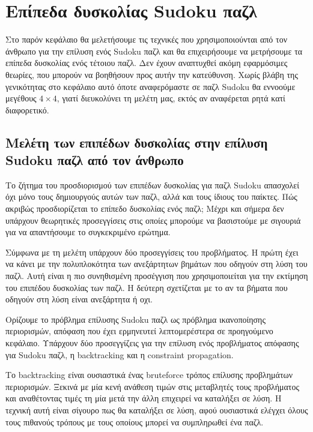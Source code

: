 \documentclass[oneside,12pt]{book}
\theoremstyle{definition}
\begin{document}
\chapter{Επίπεδα δυσκολίας Sudoku παζλ}

Στο παρόν κεφάλαιο θα μελετήσουμε τις τεχνικές που χρησιμοποιούνται από τον άνθρωπο για την επίλυση ενός Sudoku παζλ και θα επιχειρήσουμε να μετρήσουμε τα επίπεδα δυσκολίας ενός τέτοιου παζλ. Δεν έχουν αναπτυχθεί ακόμη εφαρμόσιμες θεωρίες, που μπορούν να βοηθήσουν προς αυτήν την κατεύθυνση. Χωρίς βλάβη της γενικότητας στο κεφάλαιο αυτό όποτε αναφερόμαστε σε παζλ Sudoku θα εννοούμε μεγέθους \(4 \times 4\), γιατί διευκολύνει τη μελέτη μας, εκτός αν αναφέρεται ρητά κατί διαφορετικό. \par

\section{Μελέτη των επιπέδων δυσκολίας στην επίλυση Sudoku παζλ από τον άνθρωπο}

Το ζήτημα του προσδιορισμού των επιπέδων δυσκολίας για παζλ Sudoku απασχολεί όχι μόνο τους δημιουργούς αυτών των παζλ, αλλά και τους ίδιους του παίκτες. Πώς ακριβώς προσδιορίζεται το επίπεδο δυσκολίας ενός παζλ; Μέχρι και σήμερα δεν υπάρχουν θεωρητικές προσεγγίσεις στις οποίες μπορούμε να βασιστούμε με σιγουριά για να απαντήσουμε το συγκεκριμένο ερώτημα. \par

Σύμφωνα με τη μελέτη \cite{5} υπάρχουν δύο προσεγγίσεις του προβλήματος. Η πρώτη έχει να κάνει με την πολυπλοκότητα των ανεξάρτητων βημάτων που οδηγούν στη λύση του παζλ. Αυτή είναι η πιο συνηθισμένη προσέγγιση που χρησιμοποιείται για την εκτίμηση του επιπέδου δυσκολίας των παζλ. Η δεύτερη σχετίζεται με το αν τα βήματα που οδηγούν στη λύση είναι ανεξάρτητα ή οχι. \par

Ορίζουμε το πρόβλημα επίλυσης Sudoku παζλ ως πρόβλημα ικανοποίησης περιορισμών, απόφαση που έχει ερμηνευτεί λεπτομερέστερα σε προηγούμενο κεφάλαιο. Υπάρχουν δύο προσεγγίζεις για την επίλυση ενός προβλήματος απόφασης για Sudoku παζλ, η backtracking και η constraint propagation. \par

Το backtracking είναι ουσιαστικά ένας bruteforce τρόπος επίλυσης προβλημάτων περιορισμών. Ξεκινά με μία κενή ανάθεση τιμών στις μεταβλητές τους προβλήματος και αναθέτοντας τιμές τη μία μετά την άλλη επιχειρεί να καταλήξει σε λύση. Η τεχνική αυτή είναι σίγουρο πως θα καταλήξει σε λύση, αφού ουσιαστικά ελέγχει όλους τους πιθανούς τρόπους με τους οποίους μπορεί να συμπληρωθεί ένα παζλ. \par
\end{document}
